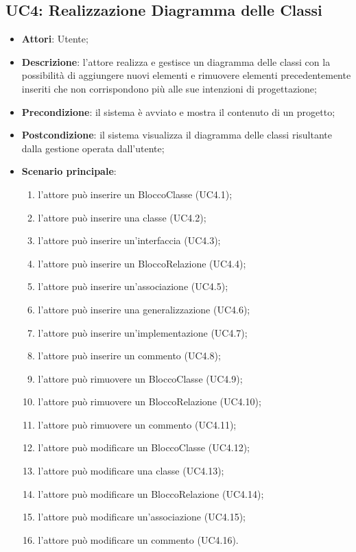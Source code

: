 \subsection{UC4: Realizzazione Diagramma delle Classi}
\label{UC4}
\begin{itemize}
	\item \textbf{Attori}: Utente;
	\item \textbf{Descrizione}: l'attore realizza e gestisce un diagramma delle classi con la possibilità di aggiungere nuovi elementi e rimuovere elementi precedentemente inseriti che non corrispondono più alle sue intenzioni di progettazione;
	\item \textbf{Precondizione}: il sistema è avviato e mostra il contenuto di un progetto;
	\item \textbf{Postcondizione}: il sistema visualizza il diagramma delle classi risultante dalla gestione operata dall'utente;
	\item \textbf{Scenario principale}:
	\begin{enumerate}
		\item l'attore può inserire un BloccoClasse (UC4.1);
		\item l'attore può inserire una classe (UC4.2);
		\item l'attore può inserire un'interfaccia (UC4.3);
		\item l'attore può inserire un BloccoRelazione (UC4.4);
		\item l'attore può inserire un'associazione (UC4.5);
		\item l'attore può inserire una generalizzazione (UC4.6);
		\item l'attore può inserire un'implementazione (UC4.7);
		\item l'attore può inserire un commento (UC4.8);
		\item l'attore può rimuovere un BloccoClasse (UC4.9);
		\item l'attore può rimuovere un BloccoRelazione (UC4.10);
		\item l'attore può rimuovere un commento (UC4.11);
		\item l'attore può modificare un BloccoClasse (UC4.12);
		\item l'attore può modificare una classe (UC4.13);
		\item l'attore può modificare un BloccoRelazione (UC4.14);
		\item l'attore può modificare un'associazione (UC4.15);
		\item l'attore può modificare un commento (UC4.16).
	\end{enumerate}
\end{itemize}

